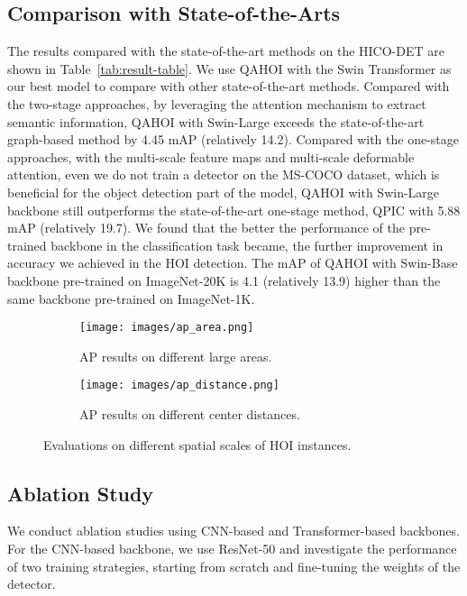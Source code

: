 \documentclass[10pt,twocolumn,letterpaper]{article}
\begin{document}
\subsection{Comparison with State-of-the-Arts}
The results compared with the state-of-the-art methods on the HICO-DET are shown in Table~\ref{tab:result-table}.
We use QAHOI with the Swin Transformer as our best model to compare with other state-of-the-art methods.
Compared with the two-stage approaches,
by leveraging the attention mechanism to extract semantic information, QAHOI with Swin-Large exceeds the state-of-the-art graph-based method \cite{zhang2020spatio} by 4.45 mAP (relatively 14.2).
Compared with the one-stage approaches,
with the multi-scale feature maps and multi-scale deformable attention, even we do not train a detector on the MS-COCO dataset, which is beneficial for the object detection part of the model,
QAHOI with Swin-Large backbone still outperforms the state-of-the-art one-stage method, QPIC with 5.88 mAP (relatively 19.7).
We found that the better the performance of the pre-trained backbone in the classification task became, the further improvement in accuracy we achieved in the HOI detection.
The mAP of QAHOI with Swin-Base backbone pre-trained on ImageNet-20K is 4.1 (relatively 13.9) higher than the same backbone pre-trained on ImageNet-1K.

\begin{figure*}
  \centering
  \begin{subfigure}{0.48\linewidth}
    \centering
    \texttt{[image: images/ap\_area.png]}
    \caption{AP results on different large areas.}
    \label{fig:spatial_area}
  \end{subfigure}
  \begin{subfigure}{0.48\linewidth}
    \centering
    \texttt{[image: images/ap\_distance.png]}
    \caption{AP results on different center distances.}
    \label{fig:spatial_distance}
  \end{subfigure}
  \caption{Evaluations on different spatial scales of HOI instances.}
  \label{fig:results_in_spatial}
\end{figure*}
\subsection{Ablation Study}
We conduct ablation studies using CNN-based and Transformer-based backbones. 
For the CNN-based backbone, we use ResNet-50 and investigate the performance of two training strategies, starting from scratch and fine-tuning the weights of the detector. 
\end{document}
